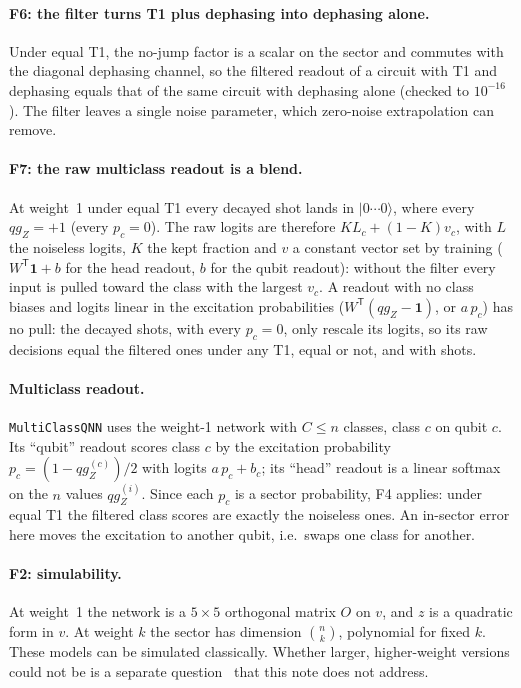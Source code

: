 \documentclass[11pt]{article}
\newcommand{\qZ}{qg_Z}
\begin{document}
\paragraph{F6: the filter turns T1 plus dephasing into dephasing alone.} Under equal T1, the no-jump factor is a
scalar on the sector and commutes with the diagonal dephasing channel, so the filtered readout of a circuit with T1
and dephasing equals that of the same circuit with dephasing alone (checked to $10^{-16}$). The filter leaves a single
noise parameter, which zero-noise extrapolation can remove.

\paragraph{F7: the raw multiclass readout is a blend.} At weight~1 under equal T1 every decayed shot lands in
$|0\cdots0\rangle$, where every $\qZ=+1$ (every $p_c=0$). The raw logits are therefore $K L_c+(1-K)v_c$, with $L$ the
noiseless logits, $K$ the kept fraction and $v$ a constant vector set by training ($W^{\mathsf T}\mathbf 1+b$ for the head
readout, $b$ for the qubit readout): without the filter every input is pulled toward the class with the largest $v_c$.
A readout with no class biases and logits linear in the excitation probabilities ($W^{\mathsf T}(\qZ-\mathbf 1)$, or
$a\,p_c$) has no pull: the decayed shots, with every $p_c=0$, only rescale its logits, so its raw decisions equal the
filtered ones under any T1, equal or not, and with shots.

\paragraph{Multiclass readout.} \texttt{MultiClassQNN} uses the weight-1 network with $C\le n$ classes, class $c$ on
qubit $c$. Its ``qubit'' readout scores class $c$ by the excitation probability $p_c=(1-\qZ^{(c)})/2$ with logits
$a\,p_c+b_c$; its ``head'' readout is a linear softmax on the $n$ values $\qZ^{(i)}$. Since each $p_c$ is a sector
probability, F4 applies: under equal T1 the filtered class scores are exactly the noiseless ones. An in-sector error
here moves the excitation to another qubit, i.e.\ swaps one class for another.

\paragraph{F2: simulability.} At weight~1 the network is a $5\times5$ orthogonal matrix $O$ on $v$, and $z$ is
a quadratic form in $v$. At weight $k$ the sector has dimension $\binom{n}{k}$, polynomial for fixed $k$.
These models can be simulated classically. Whether larger, higher-weight versions could not be is a separate
question~\cite{cerezo2023simulability} that this note does not address.
\end{document}
